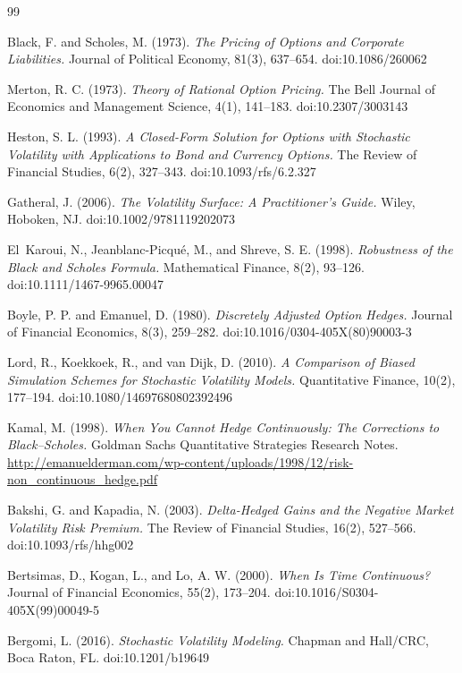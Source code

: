 \documentclass[11pt]{article}
\begin{document}
\begin{thebibliography}{99}

Black, F. and Scholes, M. (1973).
\textit{The Pricing of Options and Corporate Liabilities.}
Journal of Political Economy, 81(3), 637--654.
doi:10.1086/260062

Merton, R. C. (1973).
\textit{Theory of Rational Option Pricing.}
The Bell Journal of Economics and Management Science, 4(1), 141--183.
doi:10.2307/3003143

Heston, S. L. (1993).
\textit{A Closed-Form Solution for Options with Stochastic Volatility with Applications to Bond and Currency Options.}
The Review of Financial Studies, 6(2), 327--343.
doi:10.1093/rfs/6.2.327

Gatheral, J. (2006).
\textit{The Volatility Surface: A Practitioner's Guide.}
Wiley, Hoboken, NJ.
doi:10.1002/9781119202073

El~Karoui, N., Jeanblanc-Picqu\'e, M., and Shreve, S. E. (1998).
\textit{Robustness of the Black and Scholes Formula.}
Mathematical Finance, 8(2), 93--126.
doi:10.1111/1467-9965.00047

Boyle, P. P. and Emanuel, D. (1980).
\textit{Discretely Adjusted Option Hedges.}
Journal of Financial Economics, 8(3), 259--282.
doi:10.1016/0304-405X(80)90003-3

Lord, R., Koekkoek, R., and van Dijk, D. (2010).
\textit{A Comparison of Biased Simulation Schemes for Stochastic Volatility Models.}
Quantitative Finance, 10(2), 177--194.
doi:10.1080/14697680802392496

Kamal, M. (1998).
\textit{When You Cannot Hedge Continuously: The Corrections to Black--Scholes.}
Goldman Sachs Quantitative Strategies Research Notes. \url{http://emanuelderman.com/wp-content/uploads/1998/12/risk-non_continuous_hedge.pdf}

Bakshi, G. and Kapadia, N. (2003).
\textit{Delta-Hedged Gains and the Negative Market Volatility Risk Premium.}
The Review of Financial Studies, 16(2), 527--566.
doi:10.1093/rfs/hhg002

Bertsimas, D., Kogan, L., and Lo, A. W. (2000).
\textit{When Is Time Continuous?}
Journal of Financial Economics, 55(2), 173--204.
doi:10.1016/S0304-405X(99)00049-5

Bergomi, L. (2016).
\textit{Stochastic Volatility Modeling.}
Chapman and Hall/CRC, Boca Raton, FL.
doi:10.1201/b19649


\end{thebibliography}
\end{document}
